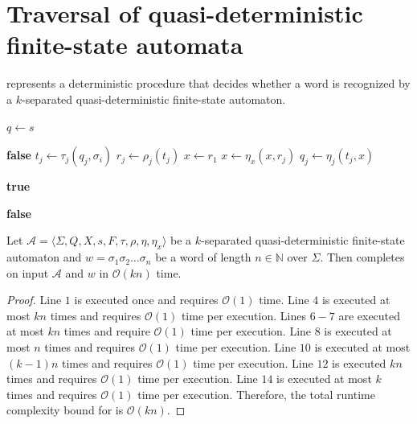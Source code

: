 \section{Traversal of quasi-deterministic finite-state automata}

 represents a deterministic procedure that decides whether
a word is recognized by a $k$-separated quasi-deterministic finite-state automaton.

\begin{algorithm}[ht]
  \DontPrintSemicolon

  $q \gets s$\;

   {
     {
       {
        \Return \textbf{false}
      }
      $t_j \gets \tau_j(q_j, \sigma_i)$\;
      $r_j \gets \rho_j(t_j)$\;
    }
    $x \gets r_1$\;
     {
      $x \gets \eta_x(x, r_j)$\;
    }
     {
      $q_j \gets \eta_j(t_j, x)$\;
    }
  }

   {
     {
      \Return \textbf{true}
    }
  }

  \Return \textbf{false}

  \caption{Traversal of a $k$-separated quasi-deterministic finite-state automaton.}
  \label{alg:qdfsa_traversal}
\end{algorithm}

\begin{proposition}
  Let $\mathcal{A} = \langle \Sigma, Q, X, s, F, \tau, \rho, \eta, \eta_x
    \rangle$ be a $k$-separated quasi-deterministic finite-state automaton and $w
    = \sigma_1 \sigma_2 \ldots \sigma_n$ be a word of length $n \in \mathbb{N}$
  over $\Sigma$. Then  completes on input
  $\mathcal{A}$ and $w$ in $\mathcal{O}(kn)$ time.
\end{proposition}

\begin{proof}
  Line $1$ is executed once and requires $\mathcal{O}(1)$ time.
  Line $4$ is executed at most $kn$ times and requires $\mathcal{O}(1)$ time
  per execution.
  Lines $6-7$ are executed at most $kn$ times and require $\mathcal{O}(1)$
  time per execution.
  Line $8$ is executed at most $n$ times and requires $\mathcal{O}(1)$ time per
  execution.
  Line $10$ is executed at most $(k-1)n$ times and requires $\mathcal{O}(1)$
  time per execution.
  Line $12$ is executed $kn$ times and requires $\mathcal{O}(1)$ time per
  execution.
  Line $14$ is executed at most $k$ times and requires $\mathcal{O}(1)$ time
  per execution.
  Therefore, the total runtime complexity bound for 
  is $\mathcal{O}(kn)$.
\end{proof}
